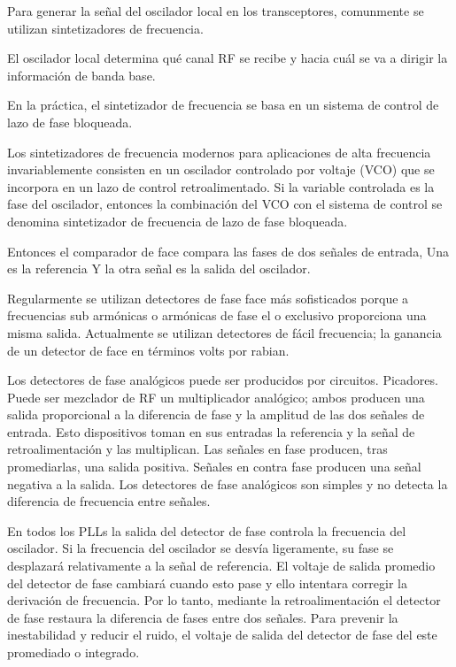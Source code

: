 \documentclass[12pt,letterpaper,titlepage,twoside]{book}
\begin{document}
Para generar la señal del oscilador local en los transceptores, comunmente se utilizan sintetizadores de frecuencia. 

El oscilador local determina qué canal RF se recibe y hacia cuál se va a dirigir la información de banda base.

En la práctica, el sintetizador de frecuencia se basa en un sistema de control de lazo de fase bloqueada.

Los sintetizadores de frecuencia modernos para aplicaciones de alta frecuencia invariablemente consisten en un oscilador controlado por voltaje (VCO) que se incorpora en un lazo de control retroalimentado. Si la variable controlada es la fase del oscilador, entonces la combinación del VCO con el sistema de control se denomina sintetizador de frecuencia de lazo de fase bloqueada. 

Entonces el comparador de face compara las fases de dos señales de entrada, Una es la referencia Y la otra señal es la salida del oscilador.

Regularmente se utilizan detectores de fase face más sofisticados porque a frecuencias sub armónicas o armónicas de fase el o exclusivo proporciona una misma salida. Actualmente se utilizan detectores de fácil frecuencia; la ganancia de un detector de face en términos volts por rabian.

Los detectores de fase analógicos puede ser producidos por circuitos. Picadores. Puede ser mezclador de RF un multiplicador analógico; ambos producen una salida proporcional a la diferencia de fase y la amplitud de las dos señales de entrada. Esto dispositivos toman en sus entradas la referencia y la señal de retroalimentación y las multiplican. Las señales en fase producen, tras promediarlas, una salida positiva. Señales en contra fase producen una señal negativa a la salida. Los detectores de fase analógicos son simples y no detecta la diferencia de frecuencia entre señales.

En todos los PLLs la salida del detector de fase controla la frecuencia del oscilador. Si la frecuencia del oscilador se desvía ligeramente, su fase se desplazará relativamente a la señal de referencia. El voltaje de salida promedio del detector de fase cambiará cuando esto pase y ello intentara corregir la derivación de frecuencia. Por lo tanto, mediante la retroalimentación el detector de fase restaura la diferencia de fases entre dos señales. Para prevenir la inestabilidad y reducir el ruido, el voltaje de salida del detector de fase del este promediado o integrado.
\end{document}
